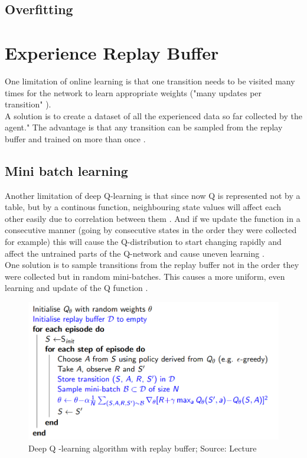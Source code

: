 \subsection{Overfitting}

\section{Experience Replay Buffer}

One limitation of online learning is that one transition needs to be visited many times for the network to learn appropriate weights ("many updates per transition" \cite{lecture_dqn}). \\

A solution is to create a dataset of all the experienced data so far collected by the agent." The advantage is that any transition can be sampled from the replay buffer and trained on more than once \cite{lecture_dqn}. 

\subsection{Mini batch learning }

Another limitation of deep Q-learning is that since now Q is represented not by a table, but by a continous function, neighbouring state values will affect each other easily due to correlation between them \cite{lecture_dqn} . And if 
we update the function in a consecutive manner (going by consecutive states in the order they were collected for example) this will cause the  Q-distribution to start changing rapidly and affect the untrained parts of the Q-network and cause uneven learning \cite{lecture_dqn}. \\

One solution is to sample transitions from the replay buffer not in the order they were collected but in random mini-batches\cite{lecture_dqn}. This causes a more uniform, even learning and update of the Q function \cite{lecture_dqn}.  

\begin{figure}[h!]
  \centering
  \includegraphics[scale=0.5]{figures/replay_buffer.PNG}
  \caption{Deep Q -learning algorithm with replay buffer; Source: Lecture}
  \label{fig:replay_buffer}
\end{figure}

